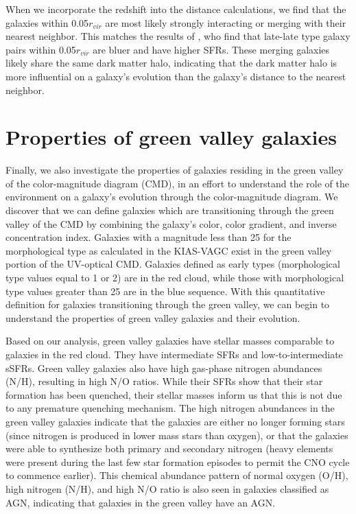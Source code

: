When we incorporate the redshift into the distance calculations, we find that 
the galaxies within 0.05$r_{vir}$ are most likely strongly interacting or 
merging with their nearest neighbor.  This matches the results of \cite{Park09}, 
who find that late-late type galaxy pairs within 0.05$r_{vir}$ are bluer and 
have higher SFRs.  These merging galaxies likely share the same dark matter 
halo, indicating that the dark matter halo is more influential on a galaxy's 
evolution than the galaxy's distance to the nearest neighbor.

\section[GV galaxies]{Properties of green valley galaxies}
Finally, we also investigate the properties of galaxies residing in the green 
valley of the color-magnitude diagram (CMD), in an effort to understand the role 
of the environment on a galaxy's evolution through the color-magnitude diagram.  
We discover that we can define galaxies which are transitioning through the 
green valley of the CMD by combining the galaxy's color, color gradient, and 
inverse concentration index.  Galaxies with a magnitude less than 25 for the 
morphological type as calculated in the KIAS-VAGC exist in the green valley 
portion of the UV-optical CMD.  Galaxies defined as early types (morphological 
type values equal to 1 or 2) are in the red cloud, while those with 
morphological type values greater than 25 are in the blue sequence.  With this 
quantitative definition for galaxies transitioning through the green valley, we 
can begin to understand the properties of green valley galaxies and their 
evolution.

Based on our analysis, green valley galaxies have stellar masses comparable to 
galaxies in the red cloud.  They have intermediate SFRs and low-to-intermediate 
sSFRs.  Green valley galaxies also have high gas-phase nitrogen abundances 
(N/H), resulting in high N/O ratios.  While their SFRs show that their star 
formation has been quenched, their stellar masses inform us that this is not due 
to any premature quenching mechanism.  The high nitrogen abundances in the green 
valley galaxies indicate that the galaxies are either no longer forming stars 
(since nitrogen is produced in lower mass stars than oxygen), or that the 
galaxies were able to synthesize both primary and secondary nitrogen (heavy 
elements were present during the last few star formation episodes to permit the 
CNO cycle to commence earlier).  This chemical abundance pattern of normal 
oxygen (O/H), high nitrogen (N/H), and high N/O ratio is also seen in galaxies 
classified as AGN, indicating that galaxies in the green valley have an AGN.

